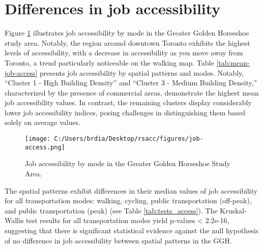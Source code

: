 \documentclass[conference,final,]{IEEEtran}
\begin{document}
\hypertarget{differences-in-job-accessibility}{%
\section{Differences in job
accessibility}\label{differences-in-job-accessibility}}

Figure \ref{fig:map_jobs} illustrates job accessibility by mode in the
Greater Golden Horseshoe study area. Notably, the region around downtown
Toronto exhibits the highest levels of accessibility, with a decrease in
accessibility as you move away from Toronto, a trend particularly
noticeable on the walking map. Table \ref{tab:mean-job-access} presents
job accessibility by spatial patterns and modes. Notably, ``Cluster 1 -
High Building Density'' and ``Cluster 3 - Medium Building Density,''
characterized by the presence of commercial areas, demonstrate the
highest mean job accessibility values. In contrast, the remaining
clusters display considerably lower job accessibility indices, posing
challenges in distinguishing them based solely on average values.

\begin{table}[!ht]
\centering
\caption{Mean values for job accessibility by spatial pattern and mode of transport}
\label{tab:mean-job-access}
\end{table}

\begin{figure}[!ht]
\centering
\texttt{[image: C:/Users/brdia/Desktop/rsacc/figures/job-access.png]}
\caption{Job accessibility by mode in the Greater Golden Horseshoe Study Area.}
\label{fig:map_jobs}
\end{figure}

The spatial patterns exhibit differences in their median values of job
accessibility for all transportation modes: walking, cycling, public
transportation (off-peak), and public transportation (peak) (see Table
\ref{tab:tests_access}). The Kruskal-Wallis test results for all
transportation modes yield p-values \textless{} 2.2e-16, suggesting that
there is significant statistical evidence against the null hypothesis of
no difference in job accessibility between spatial patterns in the GGH.
\end{document}
